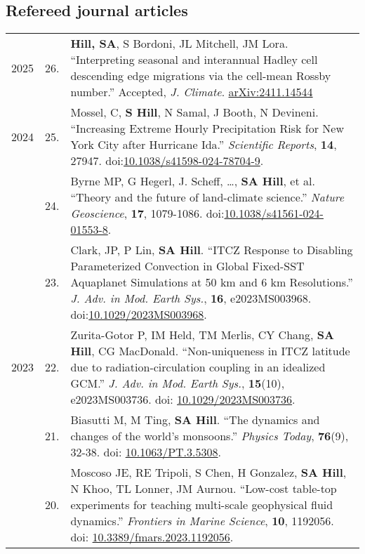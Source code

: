 \documentclass[letterpaper,11pt]{shillcv}
\begin{document}
\subsection*{Refereed journal articles}
\begin{longtable}{@{} Y{0.05\textwidth} >{\color{black}} p{0.04\textwidth} @{} L{0.91\textwidth} @{}}
2025 & 26. & \textbf{Hill, SA}, S Bordoni, JL Mitchell, JM Lora.  ``Interpreting seasonal and interannual Hadley cell descending edge migrations via the cell-mean Rossby number.''  Accepted, \emph{J. Climate}.  \href{https://arxiv.org/abs/2411.14544}{arXiv:2411.14544}\\
2024 & 25. & Mossel, C, \textbf{S Hill}, N Samal, J Booth, N Devineni. ``Increasing Extreme Hourly Precipitation Risk for New York City after Hurricane Ida.''  \emph{Scientific Reports}, \textbf{14}, 27947.  doi:\href{https://doi.org/10.1038/s41598-024-78704-9}{10.1038/s41598-024-78704-9}.\\
     & 24. & Byrne MP, G Hegerl, J. Scheff, \ldots, \textbf{SA Hill}, et al. ``Theory and the future of land-climate science.''  \emph{Nature Geoscience}, \textbf{17}, 1079-1086.  doi:\href{https://doi.org/10.1038/s41561-024-01553-8}{10.1038/s41561-024-01553-8}.\\
     & 23. & Clark, JP, P Lin, \textbf{SA Hill}. ``ITCZ Response to Disabling Parameterized Convection in Global Fixed-SST Aquaplanet Simulations at 50 km and 6 km Resolutions.'' \emph{J.  Adv. in Mod. Earth Sys.}, \textbf{16}, e2023MS003968.  doi:\href{https://doi.org/10.1029/
2023MS003968}{10.1029/2023MS003968}.\\
2023 & 22. & Zurita-Gotor P, IM Held, TM Merlis, CY Chang, \textbf{SA Hill}, CG MacDonald.  ``Non-uniqueness in ITCZ latitude due to radiation-circulation coupling in an idealized GCM.'' \emph{J.  Adv. in Mod. Earth Sys.}, \textbf{15}(10), e2023MS003736.  doi: \href{https://doi.org/10.1029/2023MS003736}{10.1029/2023MS003736}.\\
     & 21. & Biasutti M, M Ting, \textbf{SA Hill}. ``The dynamics and changes of the world’s monsoons.''  \emph{Physics Today}, \textbf{76}(9), 32-38.  doi: \href{https://doi.org/10.1063/PT.3.5308}{10.1063/PT.3.5308}.\\
     & 20. & Moscoso JE, RE Tripoli, S Chen, H Gonzalez, \textbf{SA Hill}, N Khoo, TL Lonner, JM Aurnou. ``Low-cost table-top experiments for teaching
multi-scale geophysical fluid dynamics.''  \emph{Frontiers in Marine Science}, \textbf{10}, 1192056.  doi:  \href{https://doi.org/10.3389/fmars.2023.1192056}{10.3389/fmars.2023.1192056}.\\

\end{longtable}
\end{document}
